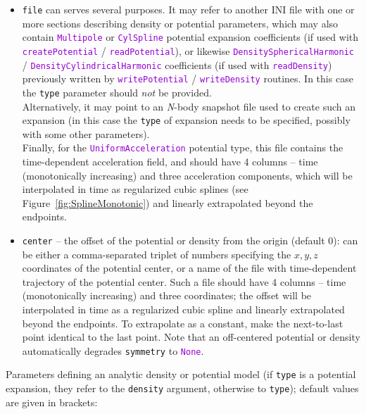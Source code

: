 \documentclass[12pt]{article}
\newcommand{\Nbody}{\textsl{N}-body\xspace}
\newcommand{\ttt}[1]{\textcolor{darkviolet}{\texttt{#1}}}
\newcommand{\ppp}[1]{\textcolor{darkolive} {\texttt{#1}}}
\begin{document}
\begin{itemize}
\item \ppp{file} can serves several purposes. It may refer to another INI file with one or more sections describing density or potential parameters, which may also contain \ttt{Multipole} or \ttt{CylSpline} potential expansion coefficients (if used with \ttt{createPotential} / \ttt{readPotential}), or likewise \ttt{DensitySphericalHarmonic} / \ttt{DensityCylindricalHarmonic} coefficients (if used with \ttt{readDensity}) previously written by \ttt{writePotential} / \ttt{writeDensity} routines. In this case the \ppp{type} parameter should \emph{not} be provided.\\ Alternatively, it may point to an \Nbody snapshot file used to create such an expansion (in this case the \ppp{type} of expansion needs to be specified, possibly with some other parameters).\\ Finally, for the \ttt{UniformAcceleration} potential type, this file contains the time-dependent acceleration field, and should have 4 columns -- time (monotonically increasing) and three acceleration components, which will be interpolated in time as regularized cubic splines (see Figure~\ref{fig:SplineMonotonic}) and linearly extrapolated beyond the endpoints. 
\item \ppp{center} -- the offset of the potential or density from the origin (default 0): can be either a comma-separated triplet of numbers specifying the $x,y,z$ coordinates of the potential center, or a name of the file with time-dependent trajectory of the potential center. Such a file should have 4 columns -- time (monotonically increasing) and three coordinates; the offset will be interpolated in time as a regularized cubic spline and linearly extrapolated beyond the endpoints. To extrapolate as a constant, make the next-to-last point identical to the last point. Note that an off-centered potential or density automatically degrades \ppp{symmetry} to \ttt{None}.
\end{itemize}
Parameters defining an analytic density or potential model (if \ppp{type} is a potential expansion, they refer to the \ppp{density} argument, otherwise to \ppp{type}); default values are given in brackets:
\end{document}

